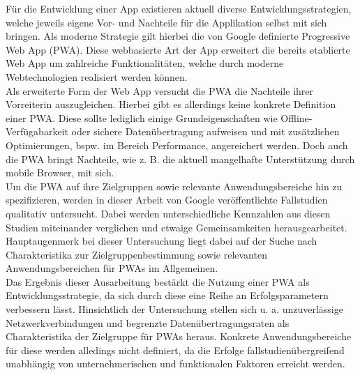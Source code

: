 
Für die Entwicklung einer App existieren aktuell diverse Entwicklungsstrategien, welche jeweils eigene Vor- und Nachteile für die Applikation selbst mit sich bringen.
Als moderne Strategie gilt hierbei die von Google definierte Progressive Web App (PWA).
Diese webbasierte Art der App erweitert die bereits etablierte Web App um zahlreiche Funktionalitäten, welche durch moderne Webtechnologien realisiert werden können.\\
Als erweiterte Form der Web App versucht die PWA die Nachteile ihrer Vorreiterin auszugleichen.
Hierbei gibt es allerdings keine konkrete Definition einer PWA.
Diese sollte lediglich einige Grundeigenschaften wie Offline-Verfügabarkeit oder sichere Datenübertragung aufweisen und mit zusätzlichen Optimierungen, bspw. im Bereich Performance, angereichert werden.
Doch auch die PWA bringt Nachteile, wie z. B. die aktuell mangelhafte Unterstützung durch mobile Browser, mit sich.\\
Um die PWA auf ihre Zielgruppen sowie relevante Anwendungsbereiche hin zu spezifizieren, werden in dieser Arbeit von Google veröffentlichte Fallstudien qualitativ untersucht.
Dabei werden unterschiedliche Kennzahlen aus diesen Studien miteinander verglichen und etwaige Gemeinsamkeiten herausgearbeitet.
Hauptaugenmerk bei dieser Untersuchung liegt dabei auf der Suche nach Charakteristika zur Zielgruppenbestimmung sowie relevanten Anwendungsbereichen für PWAs im Allgemeinen.\\
Das Ergebnis dieser Ausarbeitung bestärkt die Nutzung einer PWA als Entwicklungsstrategie, da sich durch diese eine Reihe an Erfolgsparametern verbessern lässt.
Hinsichtlich der Untersuchung stellen sich u. a. unzuverlässige Netzwerkverbindungen und begrenzte Datenübertragungsraten als Charakteristika der Zielgruppe für PWAs heraus.
Konkrete Anwendungsbereiche für diese werden alledings nicht definiert, da die Erfolge fallstudienübergreifend unabhängig von unternehmerischen und funktionalen Faktoren erreicht werden.